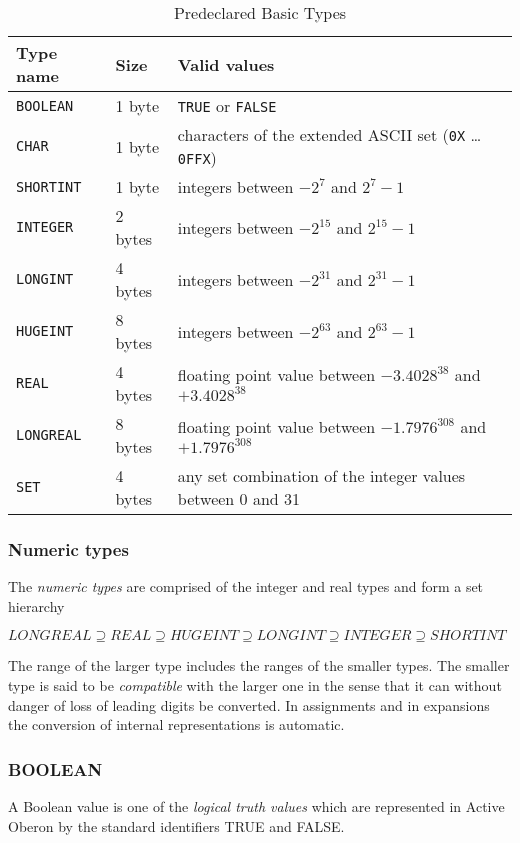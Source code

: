 \documentclass[a4paper,11pt]{article}
\begin{document}
\begin{table}[h!]
\centering
\begin{tabular}{|l|l|l|}
\hline
Type name & Size & Valid values \\
\hline\hline
\verb+BOOLEAN+ & 1 byte & \verb+TRUE+ or \verb+FALSE+ \\
\hline
\verb+CHAR+ & 1 byte & characters of the extended ASCII set (\verb+0X+ \ldots \verb+0FFX+) \\
\hline
\verb+SHORTINT+ & 1 byte & integers between $-2^{7}$ and $2^{7}-1$ \\
\verb+INTEGER+ & 2 bytes & integers between $-2^{15}$ and $2^{15}-1$ \\
\verb+LONGINT+ & 4 bytes & integers between $-2^{31}$ and $2^{31}-1$ \\
\verb+HUGEINT+ & 8 bytes & integers between $-2^{63}$ and $2^{63}-1$ \\
\hline
\verb+REAL+ & 4 bytes & floating point value between $-3.4028^{38}$ and $+3.4028^{38}$ \\
\verb+LONGREAL+ & 8 bytes & floating point value between $-1.7976^{308}$ and $+1.7976^{308}$ \\
\hline
\verb+SET+ & 4 bytes & any set combination of the integer values between 0 and 31 \\
\hline
\end{tabular}

\caption{Predeclared Basic Types}\label{table:BasicTypes}
\end{table}

\subsubsection{Numeric types} \label{section:HierarchyNumericTypes}
The {\em numeric types} are comprised of the integer and real types and form a set hierarchy

$LONGREAL \supseteq REAL \supseteq HUGEINT \supseteq LONGINT \supseteq INTEGER \supseteq SHORTINT$

The range of the larger type includes the ranges of the smaller types. The smaller type is said to be {\em compatible} with the larger one in the sense that it can without danger of loss of leading digits be converted. In assignments and in expansions the conversion of internal representations is automatic.

\subsubsection{BOOLEAN} \label{section:BooleanType}
A Boolean value is one of the {\em logical truth values} which are represented in Active Oberon by the standard identifiers TRUE and FALSE.
\end{document}
